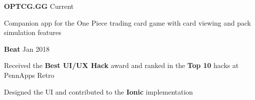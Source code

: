 



\begin{cventries}


\cventry
{\textbf{OPTCG.GG }\href{https://www.optcg.gg}{\faShareSquare}}
{Current} %
{ %
\begin{cvitems}
\item {Companion app for the One Piece trading card game with card viewing and pack simulation features}
\end{cvitems}
}





\cventry
{\textbf{Beat }\href{https://devpost.com/software/beat}{\faShareSquare}}
{Jan 2018} %
{ %
\begin{cvitems}
\item {Received the \textbf{Best UI/UX Hack} award and ranked in the \textbf{Top 10} hacks at PennApps Retro}
\item {Designed the UI and contributed to the \textbf{Ionic} implementation}
\end{cvitems}
}


\end{cventries}
